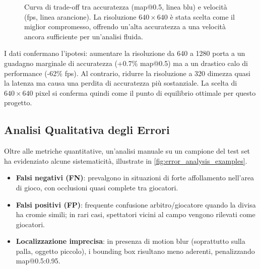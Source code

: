 \documentclass[12pt,a4paper,openright,twoside]{book}
\begin{document}
\begin{figure}[h]
  \centering
  \caption{Curva di trade-off tra accuratezza (\ac{map}@0.5, linea blu) e velocità (\ac{fps}, linea arancione).
  La risoluzione $640\times640$ è stata scelta come il miglior compromesso, offrendo un'alta accuratezza a una velocità ancora 
  sufficiente per un'analisi fluida.}
  \label{fig:ablation_resolution_plot}
\end{figure}

I dati confermano l'ipotesi: aumentare la risoluzione da 640 a 1280 porta a un guadagno marginale di accuratezza
(+0.7\% \ac{map}@0.5) ma a un drastico calo di performance (-62\% \ac{fps}). 
Al contrario, ridurre la risoluzione a 320 dimezza quasi la latenza ma causa una perdita di accuratezza più sostanziale. 
La scelta di $640\times640$ pixel si conferma quindi come il punto di equilibrio ottimale per questo progetto.

\subsection{Analisi Qualitativa degli Errori}
Oltre alle metriche quantitative, un'analisi manuale su un campione del test set ha evidenziato alcune sistematicità, 
illustrate in \autoref{fig:error_analysis_examples}.

\begin{itemize}
  \item \textbf{Falsi negativi (FN)}: prevalgono in situazioni di forte affollamento nell'area di gioco, con occlusioni 
  quasi complete tra giocatori.
  \item \textbf{Falsi positivi (FP)}: frequente confusione arbitro/giocatore quando la divisa ha cromie simili; 
  in rari casi, spettatori vicini al campo vengono rilevati come giocatori.
  \item \textbf{Localizzazione imprecisa}: in presenza di motion blur (soprattutto sulla palla, oggetto piccolo), 
  i bounding box risultano meno aderenti, penalizzando \ac{map}@0.5:0.95.
\end{itemize}
\end{document}
